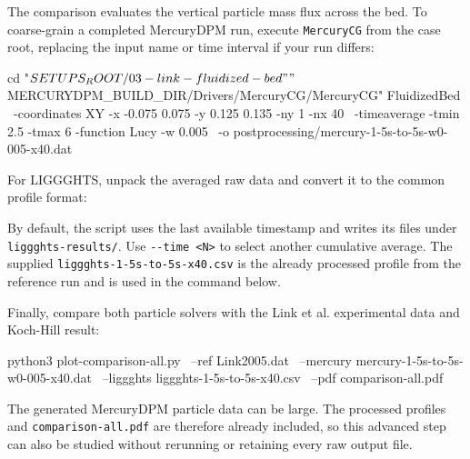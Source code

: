 The comparison evaluates the vertical particle mass flux across the bed.
To coarse-grain a completed MercuryDPM run, execute
\nolinkurl{MercuryCG} from the case root, replacing the input name or
time interval if your run differs:

\noindent\begin{minipage}{\linewidth}
\begin{CourseCode}
cd "$SETUPS_ROOT/03-link-fluidized-bed"
"$MERCURYDPM_BUILD_DIR/Drivers/MercuryCG/MercuryCG" FluidizedBed \
  -coordinates XY -x -0.075 0.075 -y 0.125 0.135 -ny 1 -nx 40 \
  -timeaverage -tmin 2.5 -tmax 6 -function Lucy -w 0.005 \
  -o postprocessing/mercury-1-5s-to-5s-w0-005-x40.dat
\end{CourseCode}
\end{minipage}

For LIGGGHTS, unpack the averaged raw data and convert it to the common
profile format:

\noindent\begin{minipage}{\linewidth}
\end{minipage}

By default, the script uses the last available timestamp and writes its
files under \nolinkurl{liggghts-results/}. Use \nolinkurl{--time <N>} to
select another cumulative average. The supplied
\nolinkurl{liggghts-1-5s-to-5s-x40.csv} is the already processed profile
from the reference run and is used in the command below.

Finally, compare both particle solvers with the Link et al. experimental
data and Koch-Hill result:

\noindent\begin{minipage}{\linewidth}
\begin{CourseCode}
python3 plot-comparison-all.py \
  --ref Link2005.dat \
  --mercury mercury-1-5s-to-5s-w0-005-x40.dat \
  --liggghts liggghts-1-5s-to-5s-x40.csv \
  --pdf comparison-all.pdf
\end{CourseCode}
\end{minipage}

The generated MercuryDPM particle data can be large. The processed
profiles and \nolinkurl{comparison-all.pdf} are therefore already
included, so this advanced step can also be studied without rerunning or
retaining every raw output file.
